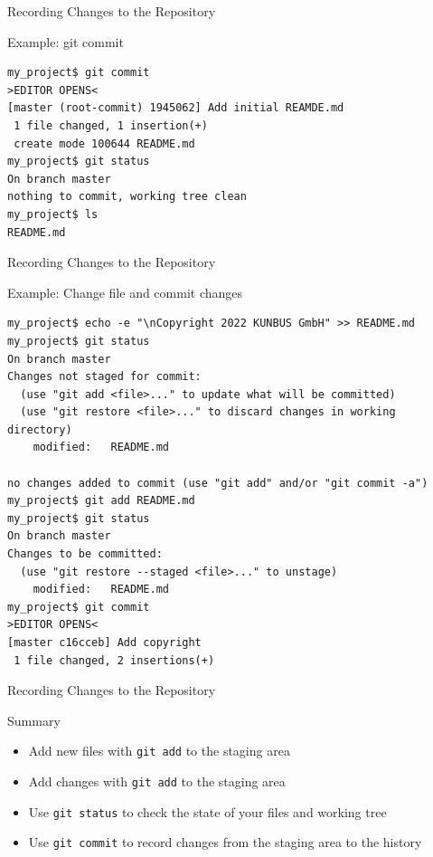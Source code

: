 \documentclass[aspectratio=169]{beamer}
\renewcommand{\footnotesize}{\tiny}
\newcommand{\sectiontitle}{}
\begin{document}
\begin{frame}[fragile]{Recording Changes to the Repository}{\sectiontitle}
\begin{block}{Example: \ttfamily git commit}
\begin{verbatim}
my_project$ git commit
>EDITOR OPENS<
[master (root-commit) 1945062] Add initial REAMDE.md
 1 file changed, 1 insertion(+)
 create mode 100644 README.md
my_project$ git status
On branch master
nothing to commit, working tree clean
my_project$ ls
README.md
\end{verbatim}
\end{block}
\end{frame}

\begin{frame}[fragile]{Recording Changes to the Repository}{\sectiontitle}
\begin{block}{Example: Change file and commit changes}
\begin{verbatim}
my_project$ echo -e "\nCopyright 2022 KUNBUS GmbH" >> README.md
my_project$ git status
On branch master
Changes not staged for commit:
  (use "git add <file>..." to update what will be committed)
  (use "git restore <file>..." to discard changes in working directory)
    modified:   README.md

no changes added to commit (use "git add" and/or "git commit -a")
my_project$ git add README.md
my_project$ git status 
On branch master
Changes to be committed:
  (use "git restore --staged <file>..." to unstage)
    modified:   README.md
my_project$ git commit
>EDITOR OPENS<
[master c16cceb] Add copyright
 1 file changed, 2 insertions(+)
\end{verbatim}
\end{block}
\end{frame}

\begin{frame}[fragile]{Recording Changes to the Repository}{\sectiontitle}
\begin{block}{Summary}
\begin{itemize}
    \item Add new files with \verb|git add| to the staging area
    \item Add changes with \verb|git add| to the staging area
    \item Use \verb|git status| to check the state of your files and working tree
    \item Use \verb|git commit| to record changes from the staging area to the history
\end{itemize}
\end{block}
\end{frame}
\end{document}
